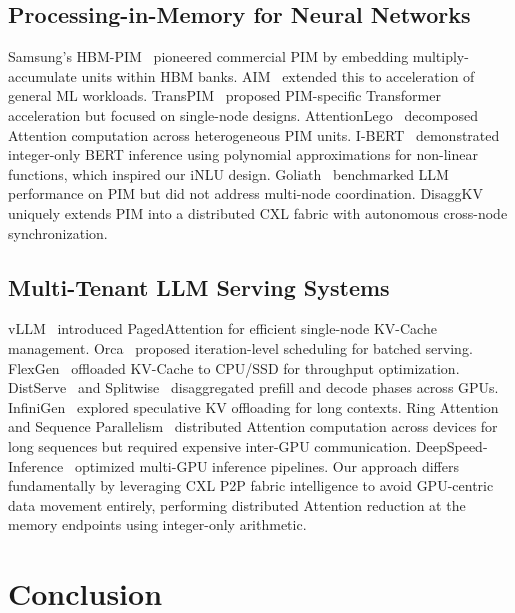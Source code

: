 \documentclass[10pt,conference]{IEEEtran}
\begin{document}
\subsection{Processing-in-Memory for Neural Networks}
Samsung's HBM-PIM~\cite{pim_samsung} pioneered commercial PIM by embedding multiply-accumulate units within HBM banks. AIM~\cite{aim_samsung} extended this to acceleration of general ML workloads. TransPIM~\cite{transpim} proposed PIM-specific Transformer acceleration but focused on single-node designs. AttentionLego~\cite{attentionlego} decomposed Attention computation across heterogeneous PIM units. I-BERT~\cite{ibert} demonstrated integer-only BERT inference using polynomial approximations for non-linear functions, which inspired our iNLU design. Goliath~\cite{goliath} benchmarked LLM performance on PIM but did not address multi-node coordination. DisaggKV uniquely extends PIM into a distributed CXL fabric with autonomous cross-node synchronization.

\subsection{Multi-Tenant LLM Serving Systems}
vLLM~\cite{vllm} introduced PagedAttention for efficient single-node KV-Cache management. Orca~\cite{orca} proposed iteration-level scheduling for batched serving. FlexGen~\cite{flexgen} offloaded KV-Cache to CPU/SSD for throughput optimization. DistServe~\cite{distserve} and Splitwise~\cite{splitwise} disaggregated prefill and decode phases across GPUs. InfiniGen~\cite{infinigen} explored speculative KV offloading for long contexts. Ring Attention~\cite{ring_attention} and Sequence Parallelism~\cite{seq_parallel} distributed Attention computation across devices for long sequences but required expensive inter-GPU communication. DeepSpeed-Inference~\cite{deepspeed_inf} optimized multi-GPU inference pipelines. Our approach differs fundamentally by leveraging CXL P2P fabric intelligence to avoid GPU-centric data movement entirely, performing distributed Attention reduction at the memory endpoints using integer-only arithmetic.

\section{Conclusion}
\end{document}
